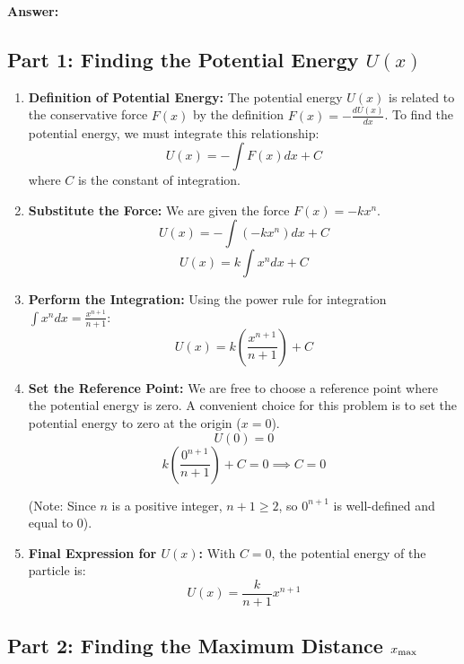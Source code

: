 \documentclass[11pt, a4paper]{article} %
\begin{document}
\textbf{Answer:}

\subsection*{Part 1: Finding the Potential Energy $U(x)$}

\begin{enumerate}
    \item \textbf{Definition of Potential Energy:} The potential energy $U(x)$ is related to the conservative force $F(x)$ by the definition $F(x) = -\frac{dU(x)}{dx}$. To find the potential energy, we must integrate this relationship:
    $$U(x) = - \int F(x) dx + C$$
    where $C$ is the constant of integration.

    \item \textbf{Substitute the Force:} We are given the force $F(x) = -kx^n$.
    $$U(x) = - \int (-kx^n) dx + C$$
    $$U(x) = k \int x^n dx + C$$

    \item \textbf{Perform the Integration:} Using the power rule for integration $\int x^n dx = \frac{x^{n+1}}{n+1}$:
    $$U(x) = k \left( \frac{x^{n+1}}{n+1} \right) + C$$

    \item \textbf{Set the Reference Point:} We are free to choose a reference point where the potential energy is zero. A convenient choice for this problem is to set the potential energy to zero at the origin ($x=0$).
    $$U(0) = 0$$
    $$k \left( \frac{0^{n+1}}{n+1} \right) + C = 0 \implies C = 0$$
    
    (Note: Since $n$ is a positive integer, $n+1 \ge 2$, so $0^{n+1}$ is well-defined and equal to 0).

    \item \textbf{Final Expression for $U(x)$:} With $C=0$, the potential energy of the particle is:
    $$U(x) = \frac{k}{n+1} x^{n+1}$$
\end{enumerate}

\hrulefill

\subsection*{Part 2: Finding the Maximum Distance $x_{\rm max}$}
\end{document}
